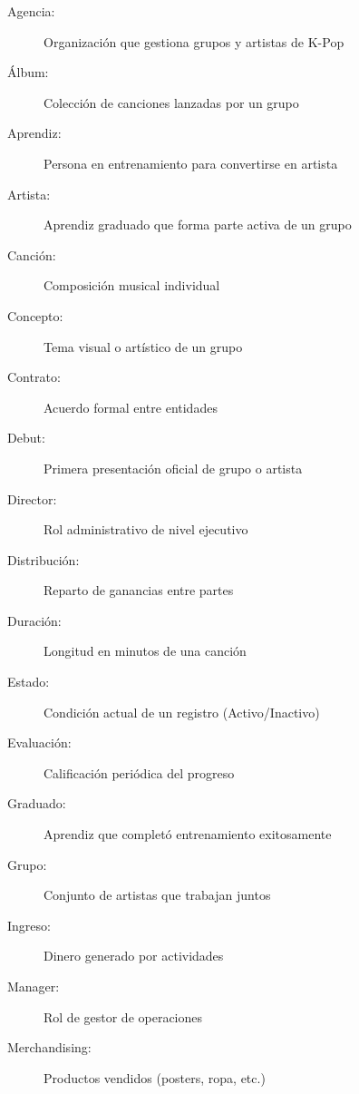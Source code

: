 \documentclass[12pt,a4paper,spanish,oneside]{report}
\begin{document}
\begin{description}
    \item[Agencia:] Organización que gestiona grupos y artistas de K-Pop
    
    \item[Álbum:] Colección de canciones lanzadas por un grupo
    
    \item[Aprendiz:] Persona en entrenamiento para convertirse en artista
    
    \item[Artista:] Aprendiz graduado que forma parte activa de un grupo
    
    \item[Canción:] Composición musical individual
    
    \item[Concepto:] Tema visual o artístico de un grupo
    
    \item[Contrato:] Acuerdo formal entre entidades
    
    \item[Debut:] Primera presentación oficial de grupo o artista
    
    \item[Director:] Rol administrativo de nivel ejecutivo
    
    \item[Distribución:] Reparto de ganancias entre partes
    
    \item[Duración:] Longitud en minutos de una canción
    
    \item[Estado:] Condición actual de un registro (Activo/Inactivo)
    
    \item[Evaluación:] Calificación periódica del progreso
    
    \item[Graduado:] Aprendiz que completó entrenamiento exitosamente
    
    \item[Grupo:] Conjunto de artistas que trabajan juntos
    
    \item[Ingreso:] Dinero generado por actividades
    
    \item[Manager:] Rol de gestor de operaciones
    
    \item[Merchandising:] Productos vendidos (posters, ropa, etc.)
    

\end{description}
\end{document}
